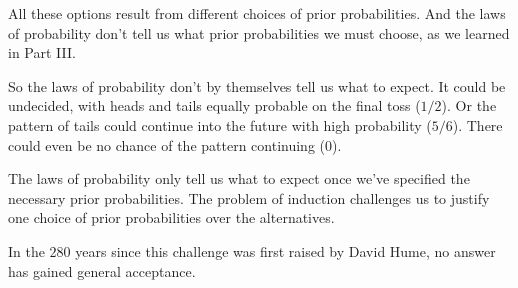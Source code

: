 \documentclass[justified]{tufte-book}
\theoremstyle{definition}
\theoremstyle{definition}
\theoremstyle{definition}
\theoremstyle{remark}
\begin{document}
All these options result from different choices of prior probabilities. And the laws of probability don't tell us what prior probabilities we must choose, as we learned in Part III.

So the laws of probability don't by themselves tell us what to expect. It could be undecided, with heads and tails equally probable on the final toss (\(1/2\)). Or the pattern of tails could continue into the future with high probability (\(5/6\)). There could even be no chance of the pattern continuing (\(0\)).

The laws of probability only tell us what to expect once we've specified the necessary prior probabilities. The problem of induction challenges us to justify one choice of prior probabilities over the alternatives.

In the \(280\) years since this challenge was first raised by David Hume, no answer has gained general acceptance.
\end{document}
